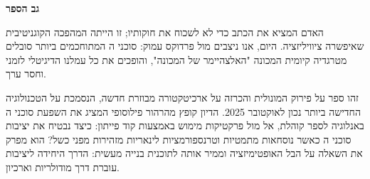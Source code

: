 \documentclass{hebrew-academic-template}
\begin{document}
\author{ד"ר יורם סגל}
\date{}
\newcommand{\version}{}
\maketitle
\vspace{-1em}
\begin{center}
\version
\end{center}

\vspace{2em}
\begin{center}
\end{center}

\newpage
\thispagestyle{empty}
\begin{center}
{\Large \textbf{גב הספר}}
\end{center}
\vspace{1em}

האדם המציא את הכתב כדי לא לשכוח את חוקותיו; זו הייתה המהפכה הקוגניטיבית שאיפשרה ציוויליזציה. היום, אנו ניצבים מול פרדוקס עמוק: סוכני ה המתוחכמים ביותר סובלים מטרגדיה קיומית המכונה "האלצהיימר של המכונה", והופכים את כל עמלנו הדיגיטלי לזמני וחסר ערך.

זהו ספר על פירוק המונולית והכרזה על ארכיטקטורה מבוזרת חדשה, הנסמכת על הטכנולוגיה החדישה ביותר נכון לאוקטובר \num{2025}. הדיון קופץ מהרהור פילוסופי המציג את השפעת סוכני ה באנלוגיה לספר קוהלת, אל מול פרקטיקות מימוש באמצעות קוד פייתון: כיצד נבטיח את יציבות סוכני ה כאשר נוסחאות מתמטיות וטרנספורמציות לינאריות מזהירות מפני כשל? הוא מפרק את השאלה על הבל האופטימיזציה וממיר אותה לתוכנית בנייה מעשית: הדרך היחידה ליציבות עוברת דרך מודולריות וארכיון.
\end{document}
